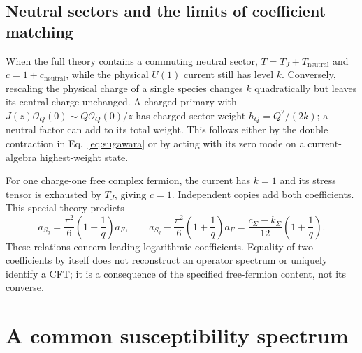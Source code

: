 \documentclass[aps,prb,onecolumn,nofootinbib,superscriptaddress]{revtex4-2}
\begin{document}
\subsection{Neutral sectors and the limits of coefficient matching}
When the full theory contains a commuting neutral sector,
$T=T_J+T_{\mathrm{neutral}}$ and
$c=1+c_{\mathrm{neutral}}$, while the physical $U(1)$ current still has
level $k$. Conversely, rescaling the physical charge of a single species
changes $k$ quadratically but leaves its central charge unchanged.
A charged primary with
$J(z)\mathcal O_Q(0)\sim Q\mathcal O_Q(0)/z$
has charged-sector weight $h_Q=Q^2/(2k)$; a neutral factor can add to its
total weight. This follows either by the double contraction in
Eq.~\eqref{eq:sugawara} or by acting with its zero mode on a
current-algebra highest-weight state.

For one charge-one free complex fermion, the current has $k=1$ and its
stress tensor is exhausted by $T_J$, giving $c=1$. Independent copies add
both coefficients. This special theory predicts
\begin{equation}
 a_{S_q}=\frac{\pi^2}{6}\left(1+\frac1q\right)a_F,\qquad
 a_{S_q}-\frac{\pi^2}{6}\left(1+\frac1q\right)a_F
 =\frac{c_\Sigma-k_\Sigma}{12}\left(1+\frac1q\right).
 \label{eq:slope-relation}
\end{equation}
These relations concern leading logarithmic coefficients. Equality of two
coefficients by itself does not reconstruct an operator spectrum or
uniquely identify a CFT; it is a consequence of the specified free-fermion
content, not its converse.

\section{A common susceptibility spectrum}
\label{sec:susceptibility}
\end{document}

